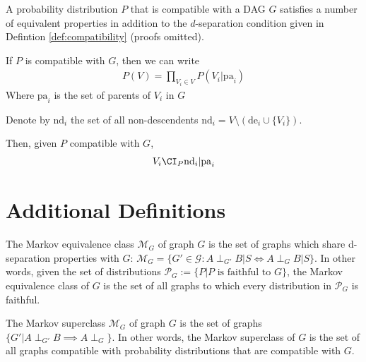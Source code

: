 A probability distribution $P$ that is compatible with a DAG $G$ satisfies a number of equivalent properties in addition to the $d$-separation condition given in Defintion \ref{def:compatibility} (proofs omitted).

\begin{definition}\label{def:markov_factorisation}
If $P$ is compatible with $G$, then we can write
\begin{align}
    P(V) = \prod_{V_i\in V} P(V_i|\mathrm{pa}_i)
\end{align}
Where $\mathrm{pa}_i$ is the set of parents of $V_i$ in $G$
\end{definition}

\begin{definition}\label{def:local_markov}
Denote by $\mathrm{nd}_i$ the set of all non-descendents $\mathrm{nd}_i=V\setminus (\mathrm{de}_i\cup\{V_i\})$.

Then, given $P$ compatible with $G$,
\begin{align}
    V_i \CI_P \mathrm{nd}_i | \mathrm{pa}_i
\end{align}
\end{definition}




\section{Additional Definitions}

\begin{definition}
The Markov equivalence class $\mathcal{M}_G$ of graph $G$ is the set of graphs which share d-separation properties with $G$: $\mathcal{M}_G=\{G'\in\mathcal{G}:A\perp_{G'}B | S \Leftrightarrow A\perp_{G}B|S\}$. In other words, given the set of distributions $\mathcal{P}_G:=\{P|P\text{ is faithful to }G\}$, the Markov equivalence class of $G$ is the set of all graphs to which every distribution in $\mathcal{P}_G$ is faithful.
\end{definition}

\begin{definition}
The Markov superclass $\mathcal{M}_G$ of graph $G$ is the set of graphs $\{G'|A\perp_{G'} B \implies A\perp_G\}$. In other words, the Markov superclass of $G$ is the set of all graphs compatible with probability distributions that are compatible with $G$. 
\end{definition}


